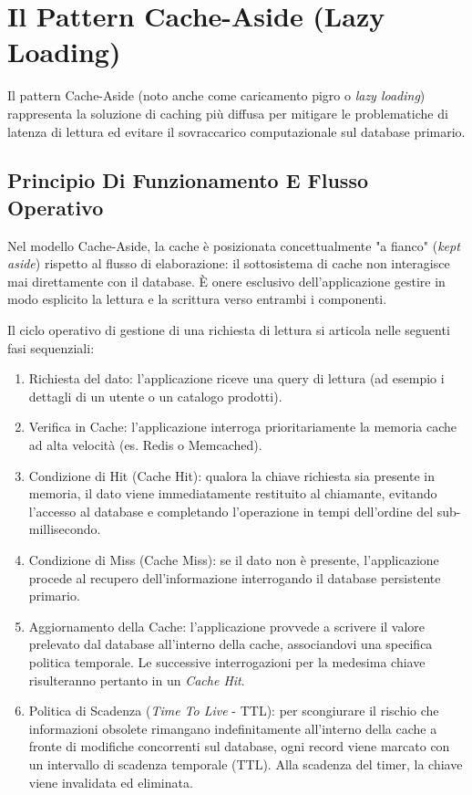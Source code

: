 \documentclass[11pt, a4paper]{article}
\begin{document}
\section{Il Pattern Cache-Aside (Lazy Loading)}

Il pattern Cache-Aside (noto anche come caricamento pigro o \emph{lazy loading}) rappresenta la soluzione di caching più diffusa per mitigare le problematiche di latenza di lettura ed evitare il sovraccarico computazionale sul database primario.

\subsection{Principio Di Funzionamento E Flusso Operativo}

Nel modello Cache-Aside, la cache è posizionata concettualmente "a fianco" (\emph{kept aside}) rispetto al flusso di elaborazione: il sottosistema di cache non interagisce mai direttamente con il database. È onere esclusivo dell'applicazione gestire in modo esplicito la lettura e la scrittura verso entrambi i componenti.


Il ciclo operativo di gestione di una richiesta di lettura si articola nelle seguenti fasi sequenziali:
\begin{enumerate}
    \item Richiesta del dato: l'applicazione riceve una query di lettura (ad esempio i dettagli di un utente o un catalogo prodotti).
    \item Verifica in Cache: l'applicazione interroga prioritariamente la memoria cache ad alta velocità (es. Redis o Memcached).
    \item Condizione di Hit (Cache Hit): qualora la chiave richiesta sia presente in memoria, il dato viene immediatamente restituito al chiamante, evitando l'accesso al database e completando l'operazione in tempi dell'ordine del sub-millisecondo.
    \item Condizione di Miss (Cache Miss): se il dato non è presente, l'applicazione procede al recupero dell'informazione interrogando il database persistente primario.
    \item Aggiornamento della Cache: l'applicazione provvede a scrivere il valore prelevato dal database all'interno della cache, associandovi una specifica politica temporale. Le successive interrogazioni per la medesima chiave risulteranno pertanto in un \emph{Cache Hit}.
    \item Politica di Scadenza (\emph{Time To Live} - TTL): per scongiurare il rischio che informazioni obsolete rimangano indefinitamente all'interno della cache a fronte di modifiche concorrenti sul database, ogni record viene marcato con un intervallo di scadenza temporale (TTL). Alla scadenza del timer, la chiave viene invalidata ed eliminata.
\end{enumerate}
\end{document}
